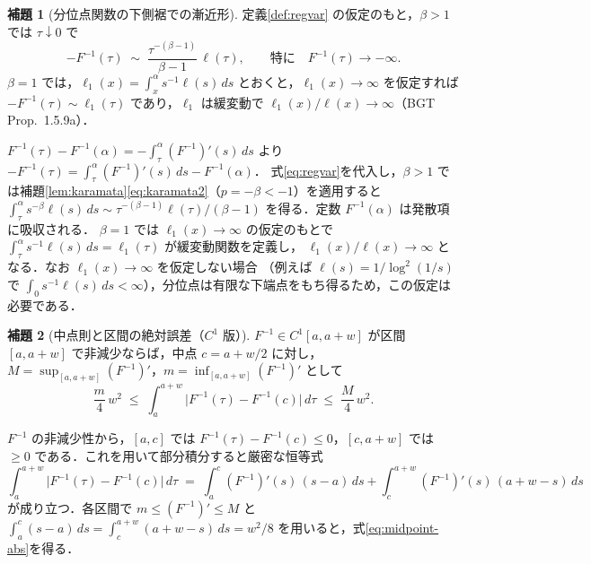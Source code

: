 \documentclass[a4paper,10pt]{jsarticle}
\makeatletter
\theoremstyle{definition}
\newtheorem{lemma}{補題}[section]
\renewenvironment{proof}[1][\proofname]{\par
  \pushQED{\qed}%
  \normalfont \topsep6\p@\@plus6\p@\relax
  \trivlist
  \item[\hskip\labelsep\textbf{#1}]\ignorespaces
}{%
  \popQED\endtrivlist\@endpefalse
}
\renewcommand{\proofname}{証明}
\newcommand{\Finv}{F^{-1}}
\makeatother
\begin{document}
\begin{lemma}[分位点関数の下側裾での漸近形]
\label{lem:tail}
定義\ref{def:regvar} の仮定のもと，$\beta>1$ では $\tau\downarrow0$ で
\begin{equation}
  -\Finv(\tau)\;\sim\;\frac{\tau^{-(\beta-1)}}{\beta-1}\,\ell(\tau),
  \qquad\text{特に}\quad \Finv(\tau)\to-\infty .
  \label{eq:tail}
\end{equation}
$\beta=1$ では，$\ell_1(x)=\int_x^\alpha s^{-1}\ell(s)\,ds$ とおくと，$\ell_1(x)\to\infty$ を仮定すれば $-\Finv(\tau)\sim\ell_1(\tau)$
であり，$\ell_1$ は緩変動で $\ell_1(x)/\ell(x)\to\infty$（BGT Prop.~1.5.9a）．
\end{lemma}
\begin{proof}
$\Finv(\tau)-\Finv(\alpha)=-\int_\tau^\alpha(\Finv)'(s)\,ds$ より
$-\Finv(\tau)=\int_\tau^\alpha(\Finv)'(s)\,ds-\Finv(\alpha)$．
式\eqref{eq:regvar}を代入し，$\beta>1$ では補題\ref{lem:karamata}\eqref{eq:karamata2}（$p=-\beta<-1$）を適用すると
$\int_\tau^\alpha s^{-\beta}\ell(s)\,ds\sim\tau^{-(\beta-1)}\ell(\tau)/(\beta-1)$ を得る．定数 $\Finv(\alpha)$ は発散項に吸収される．
$\beta=1$ では $\ell_1(x)\to\infty$ の仮定のもとで $\int_\tau^\alpha s^{-1}\ell(s)\,ds=\ell_1(\tau)$ が緩変動関数を定義し，
$\ell_1(x)/\ell(x)\to\infty$ となる．なお $\ell_1(x)\to\infty$ を仮定しない場合
（例えば $\ell(s)=1/\log^2(1/s)$ で $\int_0 s^{-1}\ell(s)\,ds<\infty$），分位点は有限な下端点をもち得るため，この仮定は必要である．
\end{proof}

\begin{lemma}[中点則と区間の絶対誤差（$C^1$ 版）]
\label{lem:midpoint}
$\Finv\in C^1[a,a+w]$ が区間 $[a,a+w]$ で非減少ならば，中点 $c=a+w/2$ に対し，$M=\sup_{[a,a+w]}(\Finv)'$，$m=\inf_{[a,a+w]}(\Finv)'$ として
\begin{equation}
  \frac{m}{4}\,w^2
  \;\le\;\int_a^{a+w}\bigl|\Finv(\tau)-\Finv(c)\bigr|\,d\tau
  \;\le\;\frac{M}{4}\,w^2 .
  \label{eq:midpoint-abs}
\end{equation}
\end{lemma}
\begin{proof}
$\Finv$ の非減少性から，$[a,c]$ では $\Finv(\tau)-\Finv(c)\le0$，$[c,a+w]$ では $\ge0$ である．これを用いて部分積分すると厳密な恒等式
\begin{equation*}
  \int_a^{a+w}\bigl|\Finv(\tau)-\Finv(c)\bigr|\,d\tau
  \;=\;\int_a^{c}(\Finv)'(s)\,(s-a)\,ds+\int_c^{a+w}(\Finv)'(s)\,(a+w-s)\,ds
\end{equation*}
が成り立つ．各区間で $m\le(\Finv)'\le M$ と $\int_a^c(s-a)\,ds=\int_c^{a+w}(a+w-s)\,ds=w^2/8$ を用いると，式\eqref{eq:midpoint-abs}を得る．
\end{proof}
\end{document}
